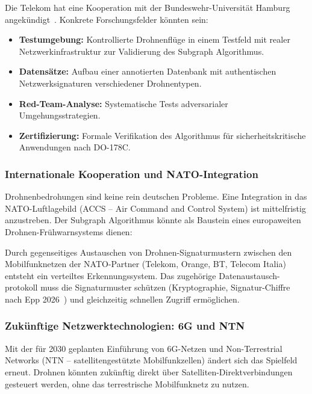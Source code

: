 ﻿\documentclass[a4paper,12pt]{article}
\theoremstyle{definition}
\begin{document}
Die Telekom hat eine Kooperation mit der Bundeswehr-Universit\"at Hamburg
angek\"undigt~\cite{telekom2026}. Konkrete Forschungsfelder k\"onnten sein:

\begin{itemize}
    \item \textbf{Testumgebung:} Kontrollierte Drohnenfl\"uge in einem
          Testfeld mit realer Netzwerkinfrastruktur zur Validierung des
          Subgraph Algorithmus.
    \item \textbf{Datens\"atze:} Aufbau einer annotierten Datenbank mit
          authentischen Netzwerksignaturen verschiedener Drohnentypen.
    \item \textbf{Red-Team-Analyse:} Systematische Tests adversarialer
          Umgehungsstrategien.
    \item \textbf{Zertifizierung:} Formale Verifikation des Algorithmus
          f\"ur sicherheitskritische Anwendungen nach DO-178C.
\end{itemize}

\subsubsection{Internationale Kooperation und NATO-Integration}

Drohnenbedrohungen sind keine rein deutschen Probleme. Eine Integration in
das NATO-Luftlagebild (ACCS -- Air Command and Control System) ist
mittelfristig anzustreben. Der Subgraph Algorithmus k\"onnte als Baustein
eines europaweiten Drohnen-Fr\"uhwarnsystems dienen:

Durch gegenseitiges Austauschen von Drohnen-Signaturmustern zwischen
den Mobilfunknetzen der NATO-Partner (Telekom, Orange, BT, Telecom Italia)
entsteht ein verteiltes Erkennungssystem. Das zugeh\"orige Datenaustausch-
protokoll muss die Signaturmuster sch\"utzen (Kryptographie, Signatur-Chiffre
nach Epp 2026~\cite{epp2026signatur}) und gleichzeitig schnellen Zugriff
erm\"oglichen.

\subsubsection{Zuk\"unftige Netzwerktechnologien: 6G und NTN}

Mit der f\"ur 2030 geplanten Einf\"uhrung von 6G-Netzen und
Non-Terrestrial Networks (NTN -- satellitengest\"utzte Mobilfunkzellen)
\"andert sich das Spielfeld erneut. Drohnen k\"onnten zuk\"unftig direkt
\"uber Satelliten-Direktverbindungen gesteuert werden, ohne das terrestrische
Mobilfunknetz zu nutzen.
\end{document}
